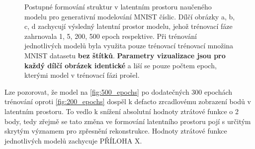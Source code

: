 \begin{figure}[H]
    \caption{Postupné formování struktur v latentním prostoru naučeného modelu pro generativní modelování MNIST číslic.
    Dílčí obrázky a, b, c, d zachycují výsledný latentní prostor modelu, jehož trénovací fáze zahrnovala 1, 5, 200, 500 epoch respektive.
    Při trénování jednotlivých modelů byla využita pouze trénovací trénovací množina MNIST datasetu \textbf{bez štítků}.
    \textbf{Parametry vizualizace jsou pro každý dílčí obrázek identické} a liší se pouze počtem epoch, kterými model v trénovací fázi prošel.
    }
    \label{fig:forming_latent_space}
\end{figure}

Lze pozorovat, že model na \autoref{fig:500_epochs} po dodatečných 300 epochách trénování oproti \autoref{fig:200_epochs} dospěl k defacto zrcadlovému zobrazení bodů v latentním prostoru. To vedlo k snížení absolutní hodnoty ztrátové funkce o 2 body, tedy zřejmě se tato změna ve formování latentního prostoru pojí s určitým skrytým významem pro zpřesnění rekonstrukce.
Hodnoty ztrátové funkce jednotlivých modelů zachycuje PŘÍLOHA X.
